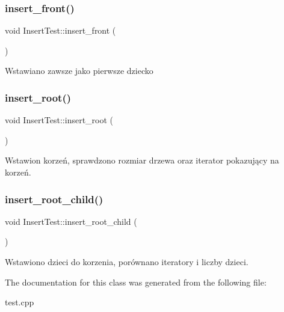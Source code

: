\subsubsection{\texorpdfstring{insert\+\_\+front()}{insert\_front()}}
{\footnotesize\ttfamily void Insert\+Test\+::insert\+\_\+front (\begin{DoxyParamCaption}{ }\end{DoxyParamCaption})\hspace{0.3cm}{\ttfamily [inline]}}

Wstawiano zawsze jako pierwsze dziecko \mbox{\label{class_insert_test_a08b1a1c6b86e528795c49c20e019d701}} 
\subsubsection{\texorpdfstring{insert\+\_\+root()}{insert\_root()}}
{\footnotesize\ttfamily void Insert\+Test\+::insert\+\_\+root (\begin{DoxyParamCaption}{ }\end{DoxyParamCaption})\hspace{0.3cm}{\ttfamily [inline]}}

Wstawion korzeń, sprawdzono rozmiar drzewa oraz iterator pokazujący na korzeń. \mbox{\label{class_insert_test_a0bab461bf75465f1f23a21a962266389}} 
\subsubsection{\texorpdfstring{insert\+\_\+root\+\_\+child()}{insert\_root\_child()}}
{\footnotesize\ttfamily void Insert\+Test\+::insert\+\_\+root\+\_\+child (\begin{DoxyParamCaption}{ }\end{DoxyParamCaption})\hspace{0.3cm}{\ttfamily [inline]}}

Wstawiono dzieci do korzenia, porównano iteratory i liczby dzieci. 

The documentation for this class was generated from the following file\+:\begin{DoxyCompactItemize}
\item 
test.\+cpp\end{DoxyCompactItemize}
